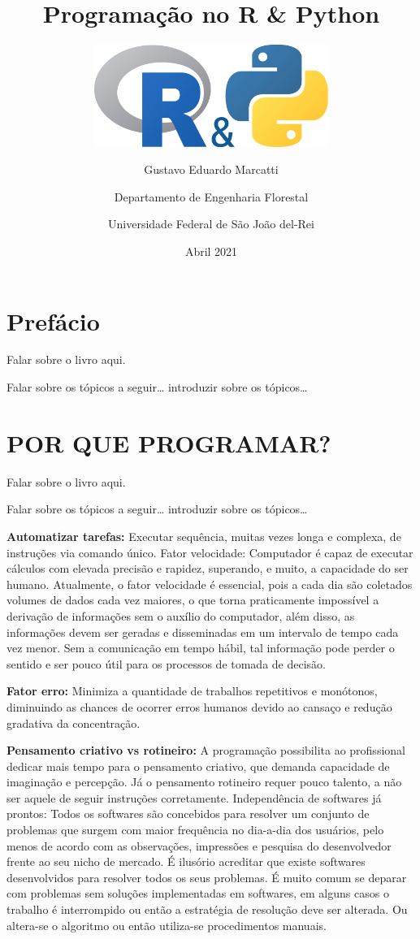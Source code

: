 \documentclass[
  11pt,
  a5paper,
  openany]{book}
\title{Programação no R \& Python}
\subtitle{\includegraphics[width=3in,height=\textheight]{images/logo.png}}
\author{Gustavo Eduardo Marcatti \and Departamento de Engenharia Florestal \and Universidade Federal de São João del-Rei}
\date{Abril 2021}
\begin{document}
\maketitle

{
\setcounter{tocdepth}{1}
\tableofcontents
}
\renewcommand{\figurename}{Figura}
\renewcommand{\tablename}{Tabela}
\renewcommand{\contentsname}{SUMÁRIO}

\hypertarget{prefuxe1cio}{%
\chapter{Prefácio}\label{prefuxe1cio}}

Falar sobre o livro aqui.

Falar sobre os tópicos a seguir\ldots{} introduzir sobre os tópicos\ldots{}

\hypertarget{por-que-programar}{%
\chapter{POR QUE PROGRAMAR?}\label{por-que-programar}}

Falar sobre o livro aqui.

Falar sobre os tópicos a seguir\ldots{} introduzir sobre os tópicos\ldots{}

\textbf{Automatizar tarefas:} Executar sequência, muitas vezes longa e complexa, de instruções via comando único.
Fator velocidade: Computador é capaz de executar cálculos com elevada precisão e rapidez, superando, e muito, a capacidade do ser humano. Atualmente, o fator velocidade é essencial, pois a cada dia são coletados volumes de dados cada vez maiores, o que torna praticamente impossível a derivação de informações sem o auxílio do computador, além disso, as informações devem ser geradas e disseminadas em um intervalo de tempo cada vez menor. Sem a comunicação em tempo hábil, tal informação pode perder o sentido e ser pouco útil para os processos de tomada de decisão.

\textbf{Fator erro:} Minimiza a quantidade de trabalhos repetitivos e monótonos, diminuindo as chances de ocorrer erros humanos devido ao cansaço e redução gradativa da concentração.

\textbf{Pensamento criativo vs rotineiro:} A programação possibilita ao profissional dedicar mais tempo para o pensamento criativo, que demanda capacidade de imaginação e percepção. Já o pensamento rotineiro requer pouco talento, a não ser aquele de seguir instruções corretamente.
Independência de softwares já prontos: Todos os softwares são concebidos para resolver um conjunto de problemas que surgem com maior frequência no dia-a-dia dos usuários, pelo menos de acordo com as observações, impressões e pesquisa do desenvolvedor frente ao seu nicho de mercado. É ilusório acreditar que existe softwares desenvolvidos para resolver todos os seus problemas. É muito comum se deparar com problemas sem soluções implementadas em softwares, em alguns casos o trabalho é interrompido ou então a estratégia de resolução deve ser alterada. Ou altera-se o algoritmo ou então utiliza-se procedimentos manuais.
\end{document}
